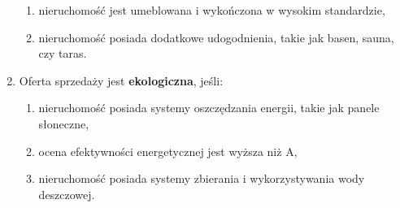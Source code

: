 \begin{enumerate}[label=S\arabic*.]
\begin{enumerate}[label=\arabic*.]
        \item nieruchomość jest umeblowana i wykończona w wysokim standardzie,
        \item nieruchomość posiada dodatkowe udogodnienia, takie jak basen, sauna, czy taras.
    \end{enumerate}
    \item Oferta sprzedaży jest \textbf{ekologiczna}, jeśli:
    \begin{enumerate}[label=\arabic*.]
        \item nieruchomość posiada systemy oszczędzania energii, takie jak panele słoneczne,
        \item ocena efektywności energetycznej jest wyższa niż A,
        \item nieruchomość posiada systemy zbierania i wykorzystywania wody deszczowej.
    \end{enumerate}
\end{enumerate}


